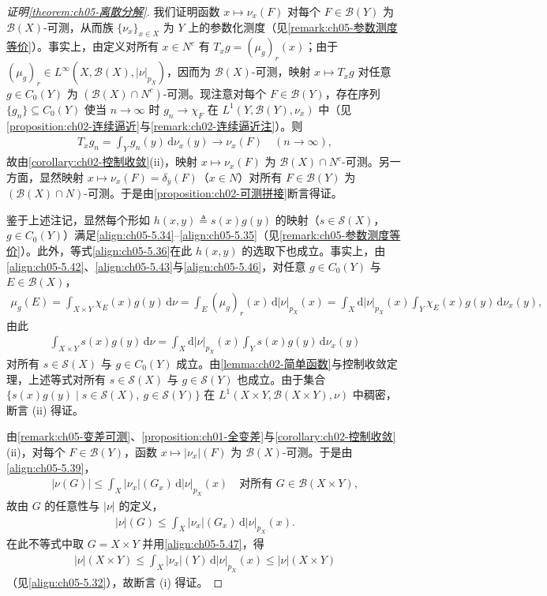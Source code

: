 \documentclass[../../main.tex]{subfiles}%
\begin{document}
\begin{proof}[证明\cref{theorem:ch05-离散分解}]
我们证明函数 $x\mapsto\nu_x(F)$ 对每个 $F\in\mathscr{B}(Y)$ 为 $\mathscr{B}(X)$-可测，从而族 $\{\nu_x\}_{x\in X}$ 为 $Y$ 上的参数化测度（见\cref{remark:ch05-参数测度等价}）。事实上，由定义对所有 $x\in N^c$ 有 $T_xg=(\mu_g)_r(x)$；由于 $(\mu_g)_r\in L^\infty(X,\mathscr{B}(X),|\nu|_{p_X})$，因而为 $\mathscr{B}(X)$-可测，映射 $x\mapsto T_xg$ 对任意 $g\in C_0(Y)$ 为 $(\mathscr{B}(X)\cap N^c)$-可测。现注意对每个 $F\in\mathscr{B}(Y)$，存在序列 $\{g_n\}\subseteq C_0(Y)$ 使当 $n\to\infty$ 时 $g_n\to\chi_F$ 在 $L^1(Y,\mathscr{B}(Y),\nu_x)$ 中（见\cref{proposition:ch02-连续逼近}与\cref{remark:ch02-连续逼近注}）。则
\begin{align*}
T_xg_n=\int_Y g_n(y)\,\mathrm{d}\nu_x(y)\to\nu_x(F)
\quad(n\to\infty),
\end{align*}
故由\cref{corollary:ch02-控制收敛}(ii)，映射 $x\mapsto\nu_x(F)$ 为 $\mathscr{B}(X)\cap N^c$-可测。另一方面，显然映射 $x\mapsto\nu_x(F)=\delta_{\bar{y}}(F)$（$x\in N$）对所有 $F\in\mathscr{B}(Y)$ 为 $(\mathscr{B}(X)\cap N)$-可测。于是由\cref{proposition:ch02-可测拼接}断言得证。

鉴于上述注记，显然每个形如 $h(x,y)\triangleq s(x)g(y)$ 的映射（$s\in\mathcal{S}(X)$，$g\in C_0(Y)$）满足\eqref{align:ch05-5.34}–\eqref{align:ch05-5.35}（见\cref{remark:ch05-参数测度等价}）。此外，等式\eqref{align:ch05-5.36}在此 $h(x,y)$ 的选取下也成立。事实上，由\eqref{align:ch05-5.42}、\eqref{align:ch05-5.43}与\eqref{align:ch05-5.46}，对任意 $g\in C_0(Y)$ 与 $E\in\mathscr{B}(X)$，
\begin{align*}
\mu_g(E)=\int_{X\times Y}\chi_E(x)g(y)\,\mathrm{d}\nu
=\int_E(\mu_g)_r(x)\,\mathrm{d}|\nu|_{p_X}(x)
=\int_X\mathrm{d}|\nu|_{p_X}(x)\int_Y\chi_E(x)g(y)\,\mathrm{d}\nu_x(y),
\end{align*}
由此
\begin{align*}
\int_{X\times Y}s(x)g(y)\,\mathrm{d}\nu
=\int_X\mathrm{d}|\nu|_{p_X}(x)\int_Y s(x)g(y)\,\mathrm{d}\nu_x(y)
\end{align*}
对所有 $s\in\mathcal{S}(X)$ 与 $g\in C_0(Y)$ 成立。由\cref{lemma:ch02-简单函数}与控制收敛定理，上述等式对所有 $s\in\mathcal{S}(X)$ 与 $g\in\mathcal{S}(Y)$ 也成立。由于集合 $\{s(x)g(y)\mid s\in\mathcal{S}(X),\ g\in\mathcal{S}(Y)\}$ 在 $L^1(X\times Y,\mathscr{B}(X\times Y),\nu)$ 中稠密，断言 (ii) 得证。

由\cref{remark:ch05-变差可测}、\cref{proposition:ch01-全变差}与\cref{corollary:ch02-控制收敛}(ii)，对每个 $F\in\mathscr{B}(Y)$，函数 $x\mapsto|\nu_x|(F)$ 为 $\mathscr{B}(X)$-可测。于是由\eqref{align:ch05-5.39}，
\begin{align*}
|\nu(G)|\leqslant\int_X|\nu_x|(G_x)\,\mathrm{d}|\nu|_{p_X}(x)
\quad\text{对所有 }G\in\mathscr{B}(X\times Y),
\end{align*}
故由 $G$ 的任意性与 $|\nu|$ 的定义，
\begin{align*}
|\nu|(G)\leqslant\int_X|\nu_x|(G_x)\,\mathrm{d}|\nu|_{p_X}(x).
\end{align*}
在此不等式中取 $G=X\times Y$ 并用\eqref{align:ch05-5.47}，得
\begin{align*}
|\nu|(X\times Y)\leqslant\int_X|\nu_x|(Y)\,\mathrm{d}|\nu|_{p_X}(x)
\leqslant|\nu|(X\times Y)
\end{align*}
（见\eqref{align:ch05-5.32}），故断言 (i) 得证。


\end{proof}
\end{document}
